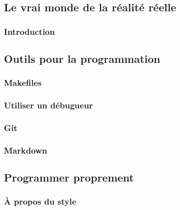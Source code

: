 \documentclass{minitelreport}
\begin{document}
\begin{refsection}
\part{Le vrai monde de la réalité réelle}
\label{part:le_vrai_monde_de_la_réalité_réelle}
	\section*{Introduction}
	
	\chapter{Outils pour la programmation}
	\label{chap:outils}
		\section{Makefiles}
			\label{sec:makefiles}
			
		\section{Utiliser un débugueur}
			\label{sec:utiliser_un_d_bugueur}
			
		\section{Git}
			\label{sec:git}
			
		\section{Markdown}
			\label{sec:le_markdown}
			
	\chapter{Programmer proprement}
	\label{chap:programmer_proprement}
		\section{À propos du style}
			\label{sec:_propos_du_style}
			

\end{refsection}
\end{document}
